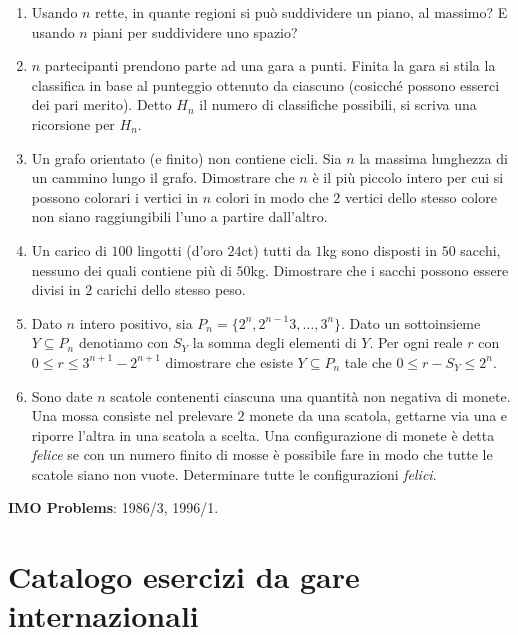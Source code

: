 \documentclass[a4paper,10pt]{article}
\begin{document}
\begin{enumerate}
	Nel mese di febbraio, tocca allo gnome Febbraio fare visita ai
	suoi amici ed eventualmente ridipingere la casetta per
	``adeguarsi alla maggioranza'', e cos\`{\i} via.

	Questa procedura si ripete di anno in anno.  Si dimostri che, da
	un certo momento in poi, nessuno gnomo avr\`{a} pi\`{u} bisogno di
	ridipingere la sua casetta (si supponga l'amicizia simmetrica, e che
	ogni gnomo non includa se stesso nella lista dei suoi amici).

\item Usando $n$ rette, in quante regioni si pu\`o suddividere un piano, al massimo? E usando $n$ piani per suddividere uno spazio?
	\item $n$ partecipanti prendono parte ad una gara a punti. Finita la gara si stila la classifica in base al punteggio ottenuto da ciascuno (cosicch\'e possono esserci dei pari merito). Detto $H_n$ il numero di classifiche possibili, si scriva una ricorsione per $H_n$.
	\item Un grafo orientato (e finito) non contiene cicli. Sia $n$ la massima lunghezza di un cammino lungo il grafo. Dimostrare che $n$ \`e il pi\`u piccolo intero per cui si possono colorari i vertici in $n$ colori in modo che $2$ vertici dello stesso colore non siano raggiungibili l'uno a partire dall'altro.
	\item Un carico di $100$ lingotti (d'oro $24$ct) tutti da $1$kg sono disposti in $50$ sacchi, nessuno dei quali contiene pi\`u di $50$kg. Dimostrare che i sacchi possono essere divisi in $2$ carichi dello stesso peso.
	\item Dato $n$ intero positivo, sia $P_n=\{2^n,2^{n-1}3,\dots,3^n\}$. Dato un sottoinsieme $Y\subseteq P_n$ denotiamo con $S_Y$ la somma degli elementi di $Y$. Per ogni reale $r$ con $0\leq r \leq 3^{n+1}-2^{n+1}$ dimostrare che esiste $Y\subseteq P_n$ tale che $0\leq r-S_Y\leq 2^n$.
	\item Sono date $n$ scatole contenenti ciascuna una quantit\`a non negativa di monete. Una mossa consiste nel prelevare $2$ monete da una scatola, gettarne via una e riporre l'altra in una scatola a scelta. Una configurazione di monete \`e detta \textit{felice} se con un numero finito di mosse \`e possibile fare in modo che tutte le scatole siano non vuote. Determinare tutte le configurazioni \textit{felici}.

\end{enumerate}
\bigskip\bigskip

\textbf{IMO Problems}: 1986/3, 1996/1.


\section{Catalogo esercizi da gare internazionali}
\end{document}

